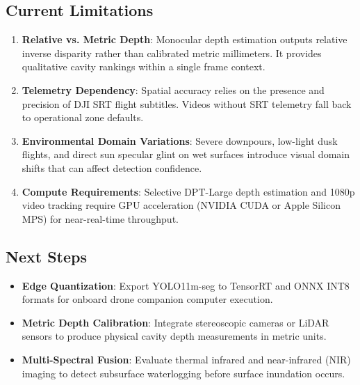 \documentclass[12pt,a4paper]{article}
\begin{document}
\subsection{Current Limitations}
\begin{enumerate}[leftmargin=1.8em, itemsep=0.1em]
    \item \textbf{Relative vs. Metric Depth}: Monocular depth estimation outputs relative inverse disparity rather than calibrated metric millimeters. It provides qualitative cavity rankings within a single frame context.
    \item \textbf{Telemetry Dependency}: Spatial accuracy relies on the presence and precision of DJI SRT flight subtitles. Videos without SRT telemetry fall back to operational zone defaults.
    \item \textbf{Environmental Domain Variations}: Severe downpours, low-light dusk flights, and direct sun specular glint on wet surfaces introduce visual domain shifts that can affect detection confidence.
    \item \textbf{Compute Requirements}: Selective DPT-Large depth estimation and 1080p video tracking require GPU acceleration (NVIDIA CUDA or Apple Silicon MPS) for near-real-time throughput.
\end{enumerate}

\subsection{Next Steps}
\begin{itemize}[leftmargin=1.5em, itemsep=0.1em]
    \item \textbf{Edge Quantization}: Export YOLO11m-seg to TensorRT and ONNX INT8 formats for onboard drone companion computer execution.
    \item \textbf{Metric Depth Calibration}: Integrate stereoscopic cameras or LiDAR sensors to produce physical cavity depth measurements in metric units.
    \item \textbf{Multi-Spectral Fusion}: Evaluate thermal infrared and near-infrared (NIR) imaging to detect subsurface waterlogging before surface inundation occurs.
\end{itemize}
\end{document}
